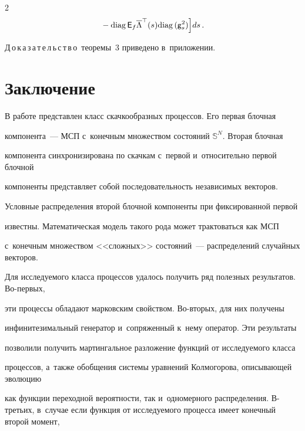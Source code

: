 \begin{multicols}{2}
\begin{multline}
{}-\mathrm{diag}\,{\mathsf E}_f 


\overline{\Lambda}^{\top}(s) \mathrm{diag}\,(\mathsf{g}^2_s)


\Bigl]ds\,.


\label{eq:sc_fg}


\end{multline}





\noindent


Д\,о\,к\,а\,з\,а\,т\,е\,л\,ь\,с\,т\,в\,о\ теоремы~3 приведено в~приложении.





\section{Заключение}





В работе представлен класс скачкообразных процессов. Его первая блочная 


компонента~--- МСП с~конечным множеством состояний $\mathbb{S}^N$. Вторая блочная 


компонента синхронизирована по скачкам с~первой и~относительно первой блочной 


компоненты представляет собой последовательность независимых векторов.


Условные распределения второй блочной компоненты при фиксированной первой 


известны. Математическая модель такого рода может трактоваться как МСП 


с~конечным множеством <<сложных>> состояний~--- распределений случайных векторов. 








Для исследуемого класса процессов удалось получить ряд полезных результатов. Во-пер\-вых, 


эти процессы обладают марковским свойством. Во-вто\-рых, для них получены 


инфинитезимальный генератор и~сопряженный к~нему оператор. Эти результаты 


позволили получить мартингальное разложение функций от исследуемого класса 


процессов, а~также обобщения сис\-те\-мы уравнений Колмогорова, описывающей эволюцию 


как функции переходной вероятности, так и~одномерного распределения. В-третьих, в~случае если функция от исследуемого процесса имеет конечный второй момент, 



\end{multicols}

